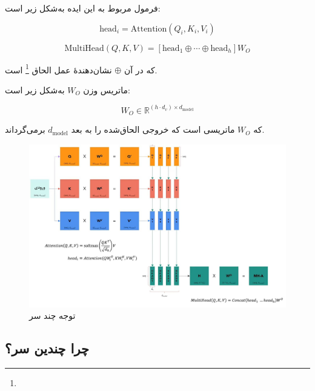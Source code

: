 فرمول مربوط به این ایده به‌شکل زیر است:


\begin{equation}
	\text{head}_i = \text{Attention}(Q_i, K_i, V_i)
	\label{eq:head_i}
\end{equation}


\begin{equation}
	\text{MultiHead}(Q, K, V) = [\text{head}_1 \oplus \cdots \oplus \text{head}_h] W_O
	\label{eq:multihead}
\end{equation}

که در آن \( \oplus \) نشان‌دهندهٔ عمل الحاق \footnote{} است.

ماتریس وزن \( W_O \) به‌شکل زیر است:

\[
W_O \in \mathbb{R}^{(h \cdot d_v) \times d_{\text{model}}}
\]

که \( W_O \) ماتریسی است که خروجی الحاق‌شده را به بعد \( d_{\text{model}} \) برمی‌گرداند.





\begin{figure}[h]
	\centering
	\begin{minipage}[b]{0.9\textwidth}
		\centering
		\includegraphics[width=\textwidth]{transformer_images/persian images/b01.png}
		\caption{توجه چند سر}
		\label{fig:attention}
	\end{minipage}
	\hfill
	
\end{figure}



\subsection*{چرا چندین سر؟}

